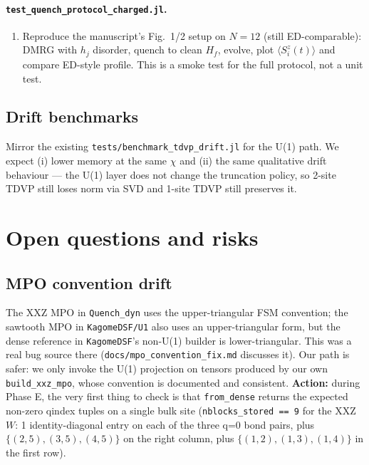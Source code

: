 \documentclass[11pt]{article}
\begin{document}
\paragraph{\texttt{test\_quench\_protocol\_charged.jl}.}
\begin{enumerate}[leftmargin=2em]
  \item Reproduce the manuscript's Fig.~1/2 setup on $N=12$ (still ED-comparable):
        DMRG with $h_j$ disorder, quench to clean $H_f$, evolve, plot
        $\langle S_i^z(t)\rangle$ and compare ED-style profile.
        This is a smoke test for the full protocol, not a unit test.
\end{enumerate}

\subsection{Drift benchmarks}
Mirror the existing \texttt{tests/benchmark\_tdvp\_drift.jl} for the U(1)
path.  We expect (i) lower memory at the same $\chi$ and (ii) the same
qualitative drift behaviour --- the U(1) layer does not change the
truncation policy, so 2-site TDVP still loses norm via SVD and 1-site TDVP
still preserves it.

\section{Open questions and risks}

\subsection{MPO convention drift}
The XXZ MPO in \texttt{Quench\_dyn} uses the upper-triangular FSM
convention; the sawtooth MPO in \texttt{KagomeDSF/U1} also uses an
upper-triangular form, but the dense reference in \texttt{KagomeDSF}'s
non-U(1) builder is lower-triangular.  This was a real bug source there
(\texttt{docs/mpo\_convention\_fix.md} discusses it).  Our path is safer:
we only invoke the U(1) projection on tensors produced by our own
\texttt{build\_xxz\_mpo}, whose convention is documented and consistent.
\textbf{Action:} during Phase E, the very first thing to check is that
\texttt{from\_dense} returns the expected non-zero qindex tuples on a
single bulk site (\texttt{nblocks\_stored == 9} for the XXZ $W$:
1 identity-diagonal entry on each of the three q=0 bond pairs, plus
$\{(2,5),(3,5),(4,5)\}$ on the right column, plus
$\{(1,2),(1,3),(1,4)\}$ in the first row).
\end{document}
